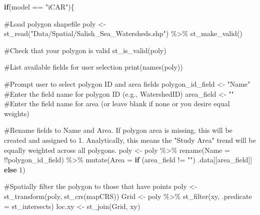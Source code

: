 \documentclass[
  letterpaper,
  DIV=11,
  numbers=noendperiod]{scrreprt}
\newenvironment{Shaded}{\begin{snugshade}}{\end{snugshade}}
\newcommand{\AttributeTok}[1]{\textcolor[rgb]{0.40,0.45,0.13}{#1}}
\newcommand{\CommentTok}[1]{\textcolor[rgb]{0.37,0.37,0.37}{#1}}
\newcommand{\ControlFlowTok}[1]{\textcolor[rgb]{0.00,0.23,0.31}{\textbf{#1}}}
\newcommand{\DecValTok}[1]{\textcolor[rgb]{0.68,0.00,0.00}{#1}}
\newcommand{\FunctionTok}[1]{\textcolor[rgb]{0.28,0.35,0.67}{#1}}
\newcommand{\NormalTok}[1]{\textcolor[rgb]{0.00,0.23,0.31}{#1}}
\newcommand{\OtherTok}[1]{\textcolor[rgb]{0.00,0.23,0.31}{#1}}
\newcommand{\SpecialCharTok}[1]{\textcolor[rgb]{0.37,0.37,0.37}{#1}}
\newcommand{\StringTok}[1]{\textcolor[rgb]{0.13,0.47,0.30}{#1}}
\begin{document}
\begin{Shaded}
\begin{Highlighting}[]
\ControlFlowTok{if}\NormalTok{(model }\SpecialCharTok{==} \StringTok{"iCAR"}\NormalTok{)\{}
  
\CommentTok{\#Load polygon shapefile}
\NormalTok{poly }\OtherTok{\textless{}{-}} \FunctionTok{st\_read}\NormalTok{(}\StringTok{"Data/Spatial/Salish\_Sea\_Watersheds.shp"}\NormalTok{) }\SpecialCharTok{\%\textgreater{}\%} \FunctionTok{st\_make\_valid}\NormalTok{()}

\CommentTok{\#Check that your polygon is valid}
\FunctionTok{st\_is\_valid}\NormalTok{(poly)}

\CommentTok{\#List available fields for user selection}
\FunctionTok{print}\NormalTok{(}\FunctionTok{names}\NormalTok{(poly))}

\CommentTok{\#Prompt user to select polygon ID and area fields}
\NormalTok{polygon\_id\_field }\OtherTok{\textless{}{-}} \StringTok{"Name"} \CommentTok{\#Enter the field name for polygon ID (e.g., \textquotesingle{}WatershedID\textquotesingle{})}
\NormalTok{area\_field }\OtherTok{\textless{}{-}} \StringTok{""} \CommentTok{\#Enter the field name for area (or leave blank if none or you desire equal weights)}

\CommentTok{\#Rename fields to \textquotesingle{}Name\textquotesingle{} and \textquotesingle{}Area\textquotesingle{}. If polygon area is missing, this will be created and assigned to 1. Analytically, this means the "Study Area" trend will be equally weighted across all polygons. }
\NormalTok{poly }\OtherTok{\textless{}{-}}\NormalTok{ poly }\SpecialCharTok{\%\textgreater{}\%}
  \FunctionTok{rename}\NormalTok{(}\AttributeTok{Name =} \SpecialCharTok{!!}\NormalTok{polygon\_id\_field) }\SpecialCharTok{\%\textgreater{}\%}
  \FunctionTok{mutate}\NormalTok{(}\AttributeTok{Area =} \ControlFlowTok{if}\NormalTok{ (area\_field }\SpecialCharTok{!=} \StringTok{""}\NormalTok{) .data[[area\_field]] }\ControlFlowTok{else} \DecValTok{1}\NormalTok{)}

\CommentTok{\#Spatially filter the polygon to those that have points}
\NormalTok{poly }\OtherTok{\textless{}{-}} \FunctionTok{st\_transform}\NormalTok{(poly, }\FunctionTok{st\_crs}\NormalTok{(mapCRS))}
\NormalTok{Grid }\OtherTok{\textless{}{-}}\NormalTok{ poly }\SpecialCharTok{\%\textgreater{}\%} \FunctionTok{st\_filter}\NormalTok{(xy, }\AttributeTok{.predicate =}\NormalTok{ st\_intersects)}
\NormalTok{loc.xy }\OtherTok{\textless{}{-}} \FunctionTok{st\_join}\NormalTok{(Grid, xy)}


\end{Highlighting}
\end{Shaded}
\end{document}
